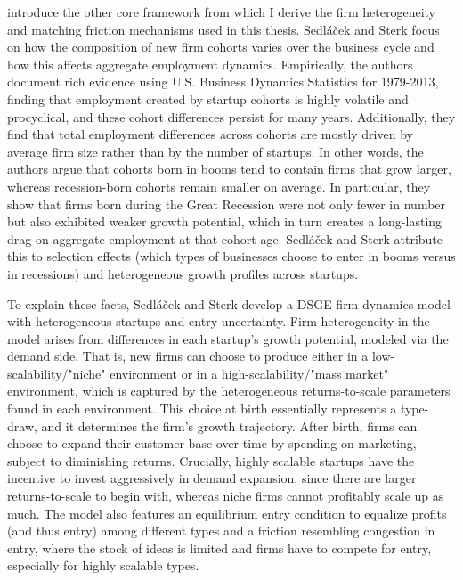 \documentclass[a4paper,12pt]{article} %
\numberwithin{equation}{section} %
\numberwithin{figure}{section}
\numberwithin{table}{section}
\begin{document}
\textcite{sedlavcek2017growth} introduce the other core framework from which I derive the firm heterogeneity and matching friction mechanisms used in this thesis. 
Sedláček and Sterk focus on how the composition of new firm cohorts varies over the business cycle and how this affects aggregate employment dynamics. 
Empirically, the authors document rich evidence using U.S. Business Dynamics Statistics for 1979-2013, finding that employment created by startup cohorts is highly
volatile and procyclical, and these cohort differences persist for many years. Additionally, they find that total employment differences across cohorts are mostly
driven by average firm size rather than by the number of startups. In other words, the authors argue that cohorts born in booms tend to contain firms that grow
larger, whereas recession-born cohorts remain smaller on average. In particular, they show that firms born during the Great Recession were not only fewer in 
number but also exhibited weaker growth potential, which in turn creates a long-lasting drag on aggregate employment at that cohort age. Sedláček and Sterk 
attribute this to selection effects (which types of businesses choose to enter in booms versus in recessions) and heterogeneous growth profiles across startups.

To explain these facts, Sedláček and Sterk develop a DSGE firm dynamics model with heterogeneous startups and entry uncertainty. Firm heterogeneity in the model arises
from differences in each startup's growth potential, modeled via the demand side. That is, new firms can choose to produce either in a low-scalability/"niche" 
environment or in a high-scalability/"mass market" environment, which is captured by the heterogeneous returns-to-scale parameters found in each environment. 
This choice at birth essentially represents a type-draw, and it determines the firm's growth trajectory. After birth, firms can choose to expand their customer 
base over time by spending on marketing, subject to diminishing returns. Crucially, highly scalable startups have the incentive to invest aggressively in demand
expansion, since there are larger returns-to-scale to begin with, whereas niche firms cannot profitably scale up as much. 
The model also features an equilibrium entry condition to equalize profits (and thus entry) among different types and a friction resembling congestion in entry,
where the stock of ideas is limited and firms have to compete for entry, especially for highly scalable types.
\end{document}
